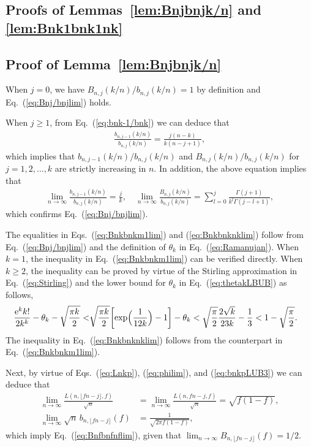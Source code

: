 \documentclass[aop]{imsart}
\theoremstyle{plain}
\theoremstyle{remark}
\newcommand{\rme}{\mathrm{e}}
\newcommand{\1}{\operatorname{\uppercase\expandafter{\romannumeral1}}}
\newcommand{\2}{\operatorname{\uppercase\expandafter{\romannumeral2}}}
\newcommand{\3}{\operatorname{\uppercase\expandafter{\romannumeral3}}}
\newcommand{\4}{\operatorname{\uppercase\expandafter{\romannumeral4}}}
\newcommand{\5}{\operatorname{\uppercase\expandafter{\romannumeral5}}}
\newcommand{\6}{\operatorname{\uppercase\expandafter{\romannumeral6}}}
\newcommand{\7}{\operatorname{\uppercase\expandafter{\romannumeral7}}}
\newcommand{\8}{\operatorname{\uppercase\expandafter{\romannumeral8}}}
\newcommand{\9}{\operatorname{\uppercase\expandafter{\romannumeral9}}}
\newcommand{\eref}[1]{Eq.~\textup{(\ref{#1})}}
\newcommand{\eqsref}[2]{Eqs.~(\ref{#1}) and (\ref{#2})}
\newcommand{\eqssref}[3]{Eqs.~(\ref{#1}), (\ref{#2}), and (\ref{#3})}
\newcommand{\lref}[1]{Lemma~\ref{#1}}
\newcommand{\lsref}[1]{Lemmas~\ref{#1}}
\begin{document}
\begin{appendix}
\section{\label{app:Bnjbnjk/n}Proofs of \lsref{lem:Bnjbnjk/n} and \ref{lem:Bnk1bnk1nk}}

\subsection{Proof of \lref{lem:Bnjbnjk/n}}
	When $j=0$, we have $B_{n,j}(k/n)/b_{n,j}(k/n)=1$	by definition and \eref{eq:Bnj/bnjlim} holds. 
	
	When $j\geq 1$, from \eref{eq:bnk-1/bnk} we can deduce that
	\begin{align}
	\frac{b_{n,j-1}(k/n)}{b_{n,j}(k/n)}=\frac{j(n-k)}{k(n-j+1)},
	\end{align}
	which implies that $b_{n,j-1}(k/n)/b_{n,j}(k/n)$ and $B_{n,j}(k/n)/b_{n,j}(k/n)$ for $j=1,2,\ldots, k$ are strictly increasing in $n$. In addition, the above equation implies that
	\begin{align}
	\lim_{n\to\infty}\frac{b_{n,j-1}(k/n)}{b_{n,j}(k/n)}=\frac{j}{k},\quad 
	\lim_{n\to\infty}\frac{B_{n,j}(k/n)}{b_{n,j}(k/n)}=\sum_{l=0}^{j}\frac{\Gamma(j+1)}{k^l\Gamma(j-l+1)},
	\end{align}
	which confirms \eref{eq:Bnj/bnjlim}. 
	
	The equalities in \eqsref{eq:Bnkbnkm1lim}{eq:Bnkbnknklim} follow from \eref{eq:Bnj/bnjlim} and the definition of $\theta_k$ in \eref{eq:Ramanujan}. When $k=1$, the inequality in \eref{eq:Bnkbnkm1lim} can be verified directly. When $k\geq 2$, the inequality can be proved by virtue of the Stirling approximation in \eref{eq:Stirling}	
	and the lower bound for $\theta_k$ in \eref{eq:thetakLBUB} as follows,
	\begin{align}
	\frac{\rme^k k!}{2k^k}-\theta_k- \sqrt{\frac{\pi k}{2}}< & \sqrt{\frac{\pi k }{2}}\biggl[\exp\Bigl(\frac{1}{12k}\Bigr)-1\biggr]-\theta_k 
	< \sqrt{\frac{\pi }{2}} \frac{2\sqrt{k}}{23k}-\frac{1}{3}<1-\sqrt{\frac{\pi }{2}}.
	\end{align}
	The inequality in \eref{eq:Bnkbnknklim} follows from the counterpart in  \eref{eq:Bnkbnkm1lim}.
	
	
	Next, by virtue of \eqssref{eq:Lnkp}{eq:philim}{eq:bnkpLUB3} we can deduce that 
	\begin{align}
	\lim_{n\to\infty}\frac{L(n,\lfloor fn-j\rfloor,f)}{\sqrt{n}}&=	\lim_{n\to\infty}\frac{L(n,fn-j,f)}{\sqrt{n}}= \sqrt{ f(1-f)},\\
\lim_{n\to\infty} \sqrt{n}\, b_{n,\lfloor fn-j\rfloor}(f)&= \frac{1}{\sqrt{2\pi f(1-f)}},
	\end{align}
	which imply  \eref{eq:Bnfbnfnflim}, given that $\lim_{n\to\infty}B_{n,\lfloor fn-j\rfloor}(f)= 1/2$.
	

\end{appendix}
\end{document}
